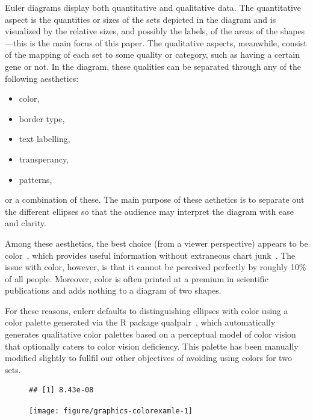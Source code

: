 \documentclass[
  oneside,
  openany,
  numbers=noendperiod,
  parskip=half,
  bibliography=totoc
]{scrbook}\usepackage[]{graphicx}\usepackage{xcolor}
\makeatletter
\newenvironment{kframe}{%
 \def\at@end@of@kframe{}%
 \ifinner\ifhmode%
  \def\at@end@of@kframe{\end{minipage}}%
  \begin{minipage}{\columnwidth}%
 \fi\fi%
 \def\FrameCommand##1{\hskip\@totalleftmargin \hskip-\fboxsep
 \colorbox{shadecolor}{##1}\hskip-\fboxsep
     \hskip-\linewidth \hskip-\@totalleftmargin \hskip\columnwidth}%
 \MakeFramed {\advance\hsize-\width
   \@totalleftmargin\z@ \linewidth\hsize
   \@setminipage}}%
 {\par\unskip\endMakeFramed%
 \at@end@of@kframe}
\newenvironment{knitrout}{}{} %
\newcommand{\pkg}[1]{{\fontseries{b}\selectfont #1}}
\makeatother
\begin{document}
Euler diagrams display both quantitative and qualitative data. The quantitative
aspect is the quantities or sizes of the sets depicted in the diagram and is
visualized by the relative sizes, and possibly the labels, of the areas of the
shapes---this is the main focus of this paper. The qualitative aspects,
meanwhile, consist of the mapping of each set to some quality or category, such
as having a certain gene or not. In the diagram, these qualities can be
separated through any of the following aesthetics:
%
\begin{itemize}
\item color,
\item border type,
\item text labelling,
\item transperancy,
\item patterns,
\end{itemize}
%
or a combination of these. The main purpose of these aethetics is to separate
out the different ellipses so that the audience may interpret the diagram with
ease and clarity.

Among these aesthetics, the best choice (from a viewer perspective) appears to
be color~\citep{blake_2016}, which provides useful information without
extraneous chart junk~\citep{tufte_2001}. The issue with color, however, is that
it cannot be perceived perfectly by roughly 10\% of all people. Moreover, color
is often printed at a premium in scientific publications and adds nothing to a
diagram of two shapes.

For these reasons, \pkg{eulerr} defaults to distinguishing ellipses with color
using a color palette generated via the R package
\pkg{qualpalr}~\citep{larsson_2016}, which automatically generates qualitative
color palettes based on a perceptual model of color vision that optionally
caters to color vision deficiency. This palette has been manually modified
slightly to fullfil our other objectives of avoiding using colors for two sets.

\begin{figure}
\begin{knitrout}\small
{}\color{fgcolor}\begin{kframe}
\begin{verbatim}
## [1] 8.43e-08
\end{verbatim}
\end{kframe}

{\centering \texttt{[image: figure/graphics-colorexamle-1]} 

}



\end{knitrout}
\label{fig:colorexample}
\end{figure}
\end{document}
